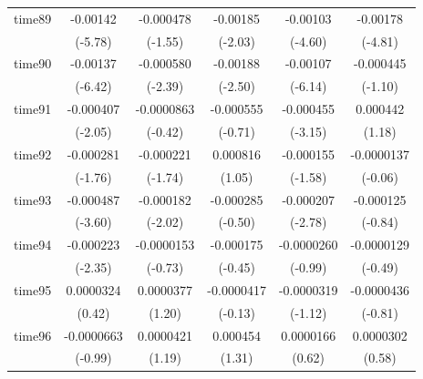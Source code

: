 \begin{table}[htbp]
\begin{tabular}{l*{5}{c}}
time89      &    -0.00142\sym{***}&   -0.000478         &    -0.00185\sym{*}  &    -0.00103\sym{***}&    -0.00178\sym{***}\\
            &     (-5.78)         &     (-1.55)         &     (-2.03)         &     (-4.60)         &     (-4.81)         \\
time90      &    -0.00137\sym{***}&   -0.000580\sym{*}  &    -0.00188\sym{*}  &    -0.00107\sym{***}&   -0.000445         \\
            &     (-6.42)         &     (-2.39)         &     (-2.50)         &     (-6.14)         &     (-1.10)         \\
time91      &   -0.000407\sym{*}  &  -0.0000863         &   -0.000555         &   -0.000455\sym{**} &    0.000442         \\
            &     (-2.05)         &     (-0.42)         &     (-0.71)         &     (-3.15)         &      (1.18)         \\
time92      &   -0.000281         &   -0.000221         &    0.000816         &   -0.000155         &  -0.0000137         \\
            &     (-1.76)         &     (-1.74)         &      (1.05)         &     (-1.58)         &     (-0.06)         \\
time93      &   -0.000487\sym{***}&   -0.000182\sym{*}  &   -0.000285         &   -0.000207\sym{**} &   -0.000125         \\
            &     (-3.60)         &     (-2.02)         &     (-0.50)         &     (-2.78)         &     (-0.84)         \\
time94      &   -0.000223\sym{*}  &  -0.0000153         &   -0.000175         &  -0.0000260         &  -0.0000129         \\
            &     (-2.35)         &     (-0.73)         &     (-0.45)         &     (-0.99)         &     (-0.49)         \\
time95      &   0.0000324         &   0.0000377         &  -0.0000417         &  -0.0000319         &  -0.0000436         \\
            &      (0.42)         &      (1.20)         &     (-0.13)         &     (-1.12)         &     (-0.81)         \\
time96      &  -0.0000663         &   0.0000421         &    0.000454         &   0.0000166         &   0.0000302         \\
            &     (-0.99)         &      (1.19)         &      (1.31)         &      (0.62)         &      (0.58)         \\

\end{tabular}
\end{table}
